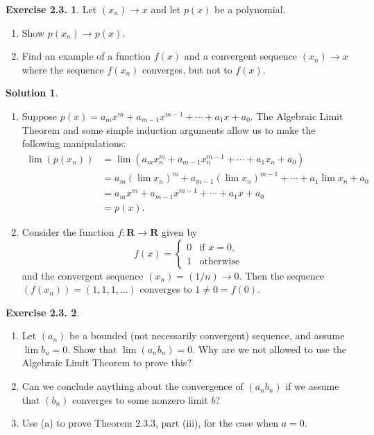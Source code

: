 \documentclass[12pt]{article}
\theoremstyle{definition}
\theoremstyle{exercise}
\newtheorem{exercise}{Exercise 2.3.}
\theoremstyle{solution}
\newtheorem*{solution}{Solution}
\newcommand{\R}{\mathbf{R}}
\begin{document}
\begin{exercise}
\label{ex:8}
    Let \( (x_n) \to x \) and let \( p(x) \) be a polynomial.
    \begin{enumerate}
        \item Show \( p(x_n) \to p(x) \).

        \item Find an example of a function \( f(x) \) and a convergent sequence \( (x_n) \to x \) where the sequence \( f(x_n) \) converges, but not to \( f(x) \).
    \end{enumerate}
\end{exercise}

\begin{solution}
    \begin{enumerate}
        \item Suppose \( p(x) = a_m x^m + a_{m-1} x^{m-1} + \cdots + a_1 x + a_0 \). The Algebraic Limit Theorem and some simple induction arguments allow us to make the following manipulations:
        \begin{align*}
            \lim (p(x_n)) &= \lim (a_m x_n^m + a_{m-1} x_n^{m-1} + \cdots + a_1 x_n + a_0) \\
            &= a_m (\lim x_n)^m + a_{m-1} (\lim x_n)^{m-1} + \cdots + a_1 \lim x_n + a_0 \\
            &= a_m x^m + a_{m-1} x^{m-1} + \cdots + a_1 x + a_0 \\
            &= p(x).
        \end{align*}

        \item Consider the function \( f : \R \to \R \) given by
        \[
            f(x) = \begin{cases}
                0 & \text{if } x = 0, \\
                1 & \text{otherwise}
            \end{cases}
        \]
        and the convergent sequence \( (x_n) = (1/n) \to 0 \). Then the sequence \( (f(x_n)) = (1, 1, 1, \ldots) \) converges to \( 1 \neq 0 = f(0) \).
    \end{enumerate}
\end{solution}

\begin{exercise}
\label{ex:9}
    \begin{enumerate}
        \item Let \( (a_n) \) be a bounded (not necessarily convergent) sequence, and assume \( \lim b_n = 0 \). Show that \( \lim (a_n b_n) = 0 \). Why are we not allowed to use the Algebraic Limit Theorem to prove this?

        \item Can we conclude anything about the convergence of \( (a_n b_n) \) if we assume that \( (b_n) \) converges to some nonzero limit \( b \)?

        \item Use (a) to prove Theorem 2.3.3, part (iii), for the case when \( a = 0 \).
    \end{enumerate}
\end{exercise}
\end{document}
